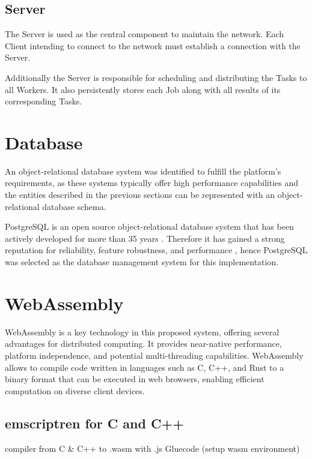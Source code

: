 \subsection{Server}
\label{subsec:methodology:entities:Server}
The Server is used as the central component to maintain the network. Each Client intending to connect to the network must establish a connection with the Server.

Additionally the Server is responsible for scheduling and distributing the Tasks to all Workers. It also persistently stores each Job along with all results of its corresponding Tasks.

\section{Database}
An object-relational database system was identified to fulfill the platform's requirements, as these systems typically offer high performance capabilities and the entities described in the previous sections can be represented with an object-relational database schema.

PostgreSQL is an open source object-relational database system that has been actively developed for more than 35 years \cite{methodology:db}. Therefore it has gained a strong reputation for reliability, feature robustness, and performance \cite{methodology:db}, hence PostgreSQL was selected as the database management system for this implementation.

\section{WebAssembly}
\label{sec:methodology:wasm}
WebAssembly is a key technology in this proposed system, offering several advantages for distributed computing. It provides near-native performance, platform independence, and potential multi-threading capabilities. WebAssembly allows to compile code written in languages such as C, C++, and Rust to a binary format that can be executed in web browsers, enabling efficient computation on diverse client devices.

\cite{methodology:wasm, methodology:wasmdocu, relatedwork:wasmedgecomputing}

\subsection{emscriptren for C and C++}
\label{subsec:methodology:wasm:cpp}
compiler from C \& C++ to .wasm with .js Gluecode (setup wasm environment) \cite{methodology:emcc}
